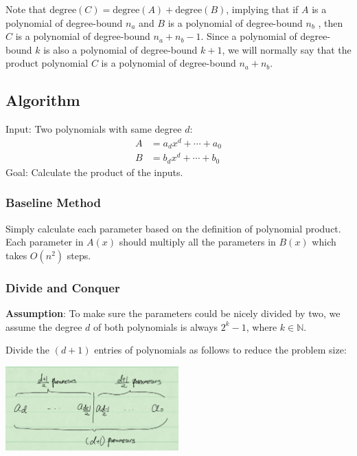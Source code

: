\documentclass[en,hazy,blue,screen,14pt]{elegantnote}
\begin{document}
Note that $\text{degree}(C) = \text{degree}(A) +  \text{degree}(B)$, implying 
that if $A$ is a polynomial of degree-bound $n_a$ and $B$ is a polynomial 
of degree-bound $n_b$ , then $C$ is a polynomial of degree-bound $n_a + n_b - 
1$. Since a polynomial of degree-bound $k$ is also a polynomial of degree-bound 
$k + 1$, we will normally say that the product polynomial $C$ is a polynomial 
of degree-bound $n_a + n_b$.

\subsection{Algorithm}
Input: Two polynomials with same degree $d$:
\begin{align*}
 A &= a_d x^d + \cdots + a_0\\
 B &= b_d x^d + \cdots + b_0
\end{align*}
Goal: Calculate the product of the inputs.

\subsubsection{Baseline Method}
Simply calculate each parameter based on the definition of polynomial product. 
Each parameter in $A(x)$ should multiply all the parameters in $B(x)$ 
which takes $O(n^2)$ steps.
\subsubsection{Divide and Conquer}
\textbf{Assumption}: To make sure the parameters could be nicely divided by 
two, we assume the degree $d$ of both polynomials is always $2^k - 1$, where $k 
\in \mathbb{N}$.

Divide the $(d+1)$ entries of polynomials as follows to reduce the problem size:

\centerline{\includegraphics[width=0.5\textwidth]{poly-devide.png}}
\end{document}
